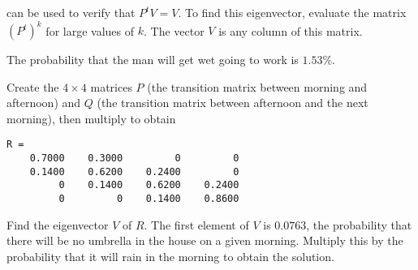 \documentclass{ximera}
\begin{document}
\soln \Matlab can be used to verify that $P^tV = V$.  To find this
eigenvector, evaluate the matrix $(P^t)^k$ for large values of $k$.
The vector $V$ is any column of this matrix.

\ans The probability that the man will get wet going to work is $1.53\%$.

\soln Create the $4 \times 4$ matrices $P$ (the transition matrix between
morning and afternoon) and $Q$ (the transition matrix between afternoon
and the next morning), then multiply to obtain \begin{verbatim}
R =
    0.7000    0.3000         0         0
    0.1400    0.6200    0.2400         0
         0    0.1400    0.6200    0.2400
         0         0    0.1400    0.8600
\end{verbatim}
Find the eigenvector $V$ of $R$.  The first element of $V$ is $0.0763$,
the probability that there will be no umbrella in the house on a given
morning.  Multiply this by the probability that it will rain in the
morning to obtain the solution.
\end{document}
